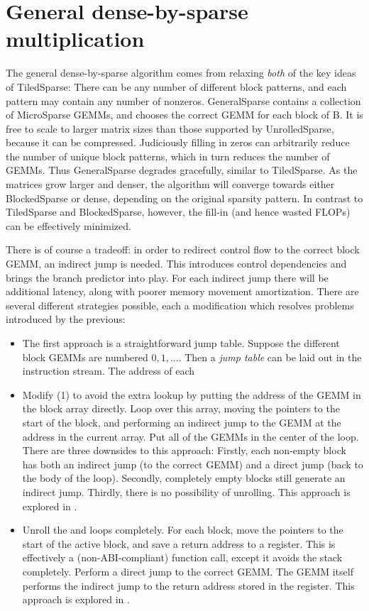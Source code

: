 \section{General dense-by-sparse multiplication}

The general dense-by-sparse algorithm comes from relaxing \emph{both} of the key ideas of TiledSparse: There can be any number of different block patterns, and each pattern may contain any number of nonzeros. GeneralSparse contains a collection of MicroSparse GEMMs, and chooses the correct GEMM for each block of B. It is free to scale to larger matrix sizes than those supported by UnrolledSparse, because it can be compressed. Judiciously filling in zeros can arbitrarily reduce the number of unique block patterns, which in turn reduces the number of GEMMs. Thus GeneralSparse degrades gracefully, similar to TiledSparse. As the matrices grow larger and denser, the algorithm will converge towards either BlockedSparse or dense, depending on the original sparsity pattern. In contrast to TiledSparse and BlockedSparse, however, the fill-in (and hence wasted FLOPs) can be effectively minimized.

There is of course a tradeoff: in order to redirect control flow to the correct block GEMM, an indirect jump is needed. This introduces control dependencies and brings the branch predictor into play. For each indirect jump there will be additional latency, along with poorer memory movement amortization. There are several different strategies possible, each a modification which resolves problems introduced by the previous:

\begin{itemize}
  \item The first approach is a straightforward jump table. Suppose the different block GEMMs are numbered $0,1,...$. Then a \emph{jump table} can be laid out in the instruction stream. The address of each 


  \item Modify (1) to avoid the extra lookup by putting the address of the GEMM in the block array directly. Loop over this array, moving the  pointers to the start of the block, and performing an indirect jump to the GEMM at the address in the current array. Put all of the GEMMs in the center of the loop. There are three downsides to this approach: Firstly, each non-empty block has both an indirect jump (to the correct GEMM) and a direct jump (back to the body of the loop). Secondly, completely empty blocks still generate an indirect jump. Thirdly, there is no possibility of unrolling. This approach is explored in .

  \item Unroll the  and  loops completely. For each block, move the  pointers to the start of the active block, and save a return address to a register. This is effectively a (non-ABI-compliant) function call, except it avoids the stack completely. Perform a direct jump to the correct GEMM. The GEMM itself performs the indirect jump to the return address stored in the register. This approach is explored in .
\end{itemize}

